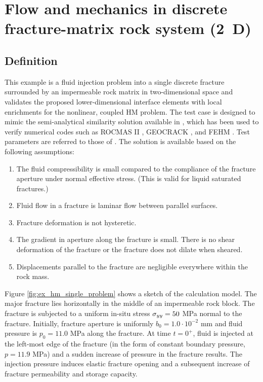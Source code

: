 \section{Flow and mechanics in discrete fracture-matrix rock system (2~D)}
\subsection{Definition}
This example is a fluid injection problem into a single discrete fracture surrounded by an impermeable rock matrix in two-dimensional space and validates the proposed lower-dimensional interface elements with local enrichments for the nonlinear, coupled HM problem. 
The test case is designed to mimic the semi-analytical similarity solution available in \cite{Wijesinghe1986}, which has been used to verify numerical codes such as ROCMAS II \cite{Noorishad1992}, GEOCRACK \cite{Swenson1995}, and FEHM \cite{Bower1997}. Test parameters are referred to those of  \cite{Bower1997}.
The solution is available based on the following assumptions:
\begin{enumerate}
\item  The fluid compressibility is small compared to the compliance of the fracture aperture under normal effective stress. (This is valid for liquid saturated fractures.)
\item  Fluid flow in a fracture is laminar flow between parallel surfaces.
\item  Fracture deformation is not hysteretic.
\item  The gradient in aperture along the fracture is small. There is no shear deformation of the fracture or the fracture does not dilate when sheared.
\item  Displacements parallel to the fracture are negligible everywhere within the rock mass.
\end{enumerate}

Figure \ref{fig:ex_hm_single_problem} shows a sketch of the calculation model. The major fracture lies horizontally in the middle of an impermeable rock block.  
The fracture is subjected to a uniform in-situ stress $\sigma_{yy}=50$ MPa normal to the fracture. Initially, fracture aperture is uniformly $b_0 = 1.0 \cdot 10^{-2}$ mm and fluid pressure is $p_0=11.0$ MPa along the fracture. At time $t=0^+$, fluid is injected at the left-most edge of the fracture (in the form of constant boundary pressure, $p=11.9$ MPa) and a sudden increase of pressure in the fracture results.
%
The injection pressure induces elastic fracture opening and a subsequent increase of fracture permeability and storage capacity. 
%

